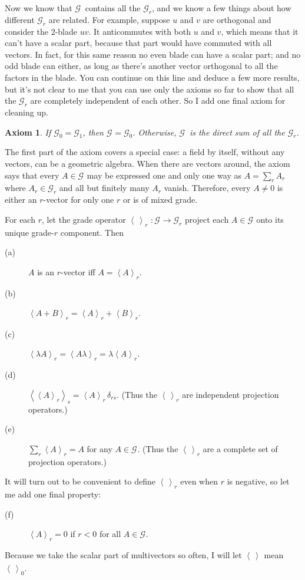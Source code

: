 \documentclass{utarticle}
\newcommand{\G}[1][]{\ensuremath{\mathcal{G}_{#1}}}
\newcommand{\grade}[2][]{\ensuremath{\left\langle #2 \right\rangle_{#1}}}
\newtheorem{axiom}{Axiom}
\begin{document}
Now we know that \G\ contains all the \G[r], and we know a few things about
how different \G[r] are related.  For example, suppose $u$ and $v$ are orthogonal 
and consider the $2$-blade $uv$.  It anticommutes with both $u$ and $v$, which 
means that it can't have a scalar part, because that part would have commuted with 
all vectors.  In fact, for this same reason no even blade can have a scalar part; and 
no odd blade can either, as long as there's another vector orthogonal to all the factors 
in the blade.  You can continue on this line and deduce a few more results, but it's not 
clear to me that you can use only the axioms so far to show that all the \G[r] are completely 
independent of each other.  So I add one final axiom for cleaning up.


\begin{axiom}
If $\G[0] = \G[1]$, then $\G = \G[0]$.  Otherwise, \G\ is the direct sum of all the \G[r].
\label{dirsum}
\end{axiom}

The first part of the axiom covers a special case: a field by itself, without any vectors, 
can be a geometric algebra.  When there are vectors around, the axiom says that every 
$A \in \G$ may be expressed one and only one way
as $A = \sum_r A_r$ where $A_r \in \G[r]$ and all but finitely many
$A_r$ vanish.  Therefore, every $A \neq 0$ is either an $r$-vector for
only one $r$ or is of mixed grade.

For each $r$, let the grade operator \grade[r]{\,} $: \G \rightarrow
\G[r]$ project each $A \in \G$ onto its unique grade-$r$ component.
Then
\begin{description}
\item[(a)] $A$ is an $r$-vector iff $A = \grade[r]{A}$.
\item[(b)] $\grade[r]{A + B} = \grade[r]{A} + \grade[r]{B}$.
\item[(c)] $\grade[r]{\lambda A} = \grade[r]{A \lambda} = \lambda \grade[r]{A}$.
\item[(d)] $\grade[s]{\grade[r]{A}} = \grade[r]{A}\,\delta_{rs}$.  
     (Thus the \grade[r]{\,} are independent projection operators.)
\item[(e)] $\sum_r \grade[r]{A} = A$ for any $A \in \G$.
     (Thus the \grade[r]{\,} are a complete set of projection operators.)
\end{description}
It will turn out to be convenient to define \grade[r]{\,}
even when $r$ is negative, so let me add one final property:
\begin{description}
\item[(f)] $\grade[r]{A} = 0$ if $r < 0$ for all $A \in \G$.
\end{description}
Because we take the scalar part of multivectors so often, I will let
\grade{\,} mean \grade[0]{\,}.
\end{document}
